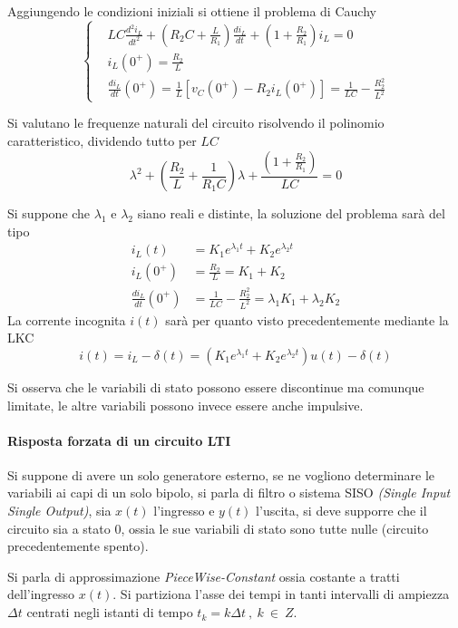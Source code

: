 Aggiungendo le condizioni iniziali si ottiene il problema di Cauchy
$$\left\{
\begin{aligned}
&LC\frac{d^2i_L}{dt^2} + \left(R_2C +\frac{L}{R_1}\right)\frac{di_L}{dt} + \left(1+\frac{R_2}{R_1}\right)i_L = 0
\\
&i_L(0^+) = \frac{R_2}{L}\\
&\frac{di_L}{dt}(0^+) = \frac{1}{L} \left[v_C(0^+) - R_2i_L(0^+)\right] = \frac{1}{LC} - \frac{R_2^2}{L^2}
\end{aligned}\right.
$$

Si valutano le frequenze naturali del circuito risolvendo il polinomio caratteristico, dividendo tutto per $LC$
$$
\lambda^2 + \left(\frac{R_2}{L} + \frac{1}{R_1C}\right)\lambda + \frac{\left(1+\frac{R_2}{R_1}\right)}{LC}=0
$$

Si suppone che $\lambda_1$ e $\lambda_2$ siano reali e distinte, la soluzione del problema sarà del tipo
$$\begin{aligned}
i_L(t) &= K_1e^{\lambda_1t} + K_2e^{\lambda_2t}\\
i_L(0^+) &=\frac{R_2}{L} = K_1 + K_2\\
\frac{di_L}{dt}(0^+) &= \frac{1}{LC} - \frac{R_2^2}{L^2} = \lambda_1K_1 + \lambda_2K_2
\end{aligned}
$$
La corrente incognita $i(t)$ sarà per quanto visto precedentemente mediante la LKC
$$
i(t) = i_L-\delta(t) = \left(K_1e^{\lambda_1t} + K_2e^{\lambda_2t}\right)u(t) -\delta(t)
$$

Si osserva che le variabili di stato possono essere discontinue ma comunque limitate, le altre
variabili possono invece essere anche impulsive.

\newpage
\paragraph{Risposta forzata di un circuito LTI}
Si suppone di avere un solo generatore esterno, se ne vogliono determinare le variabili ai capi
di un solo bipolo, si parla di filtro o sistema SISO \textit{(Single Input Single Output)},
sia $x(t)$ l'ingresso e $y(t)$ l'uscita, si deve supporre che il circuito sia a stato 0, ossia
le sue variabili di stato sono tutte nulle (circuito precedentemente spento).

Si parla di approssimazione \textit{PieceWise-Constant} ossia costante a tratti dell'ingresso
$x(t)$.
Si partiziona l'asse dei tempi in tanti intervalli di ampiezza $\Delta t$ centrati negli istanti
di tempo $t_k = k\Delta t\ ,\ k\ \in\ Z$.

